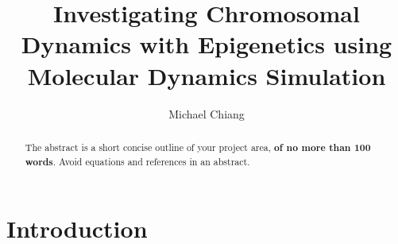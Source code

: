 \documentclass[12pt]{article}
\begin{document}
\title{Investigating Chromosomal Dynamics with Epigenetics using Molecular Dynamics Simulation} %
\author{Michael Chiang} %

\begin{abstract}
The abstract is a short concise outline of your project area, {\bf of no more than 100 words}. Avoid equations and references in an abstract. 
\end{abstract}

\maketitle

\personalstatement


\maintext


\section{Introduction}

\end{document}
